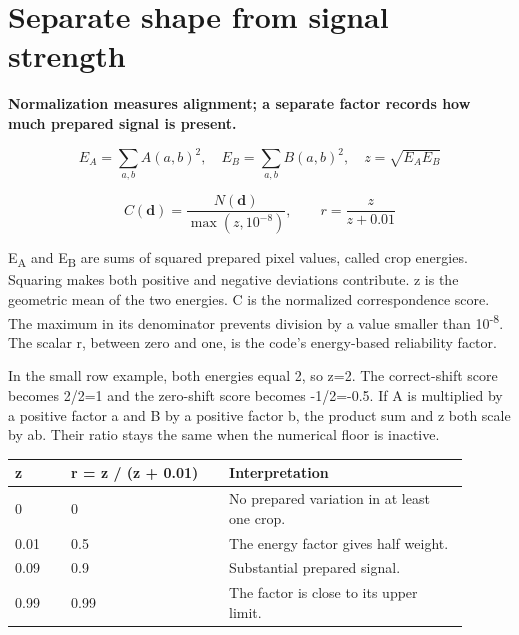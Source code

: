 \documentclass[11pt,letterpaper]{article}
\begin{document}
\clearpage

\section{Separate shape from signal strength}\label{sec5}

\textbf{Normalization measures alignment; a separate factor records how much prepared signal is present.}


\begin{equation}E_A=\sum_{a,b}A(a,b)^2,\quad E_B=\sum_{a,b}B(a,b)^2,\quad z=\sqrt{E_AE_B}\end{equation}

\begin{equation}C(\mathbf d)=\frac{N(\mathbf d)}{\max(z,10^{-8})},\qquad r=\frac{z}{z+0.01}\end{equation}

E\textsubscript{A} and E\textsubscript{B} are sums of squared prepared pixel values, called crop energies. Squaring makes both positive and negative deviations contribute. z is the geometric mean of the two energies. C is the normalized correspondence score. The maximum in its denominator prevents division by a value smaller than 10\textsuperscript{-8}. The scalar r, between zero and one, is the code's energy-based reliability factor.


In the small row example, both energies equal 2, so z=2. The correct-shift score becomes 2/\allowbreak{}2=1 and the zero-shift score becomes -1/\allowbreak{}2=-0.5. If A is multiplied by a positive factor a and B by a positive factor b, the product sum and z both scale by ab. Their ratio stays the same when the numerical floor is inactive.


\begin{center}\small\renewcommand{\arraystretch}{1.16}\setlength{\tabcolsep}{4pt}\begin{tabular}{p{0.110\linewidth}p{0.312\linewidth}p{0.478\linewidth}}\toprule

\textbf{z} & \textbf{r = z /\allowbreak{} (z + 0.01)} & \textbf{Interpretation} \\

\midrule

0 & 0 & No prepared variation in at least one crop. \\

0.01 & 0.5 & The energy factor gives half weight. \\

0.09 & 0.9 & Substantial prepared signal. \\

0.99 & 0.99 & The factor is close to its upper limit. \\

\bottomrule\end{tabular}\end{center}
\end{document}
